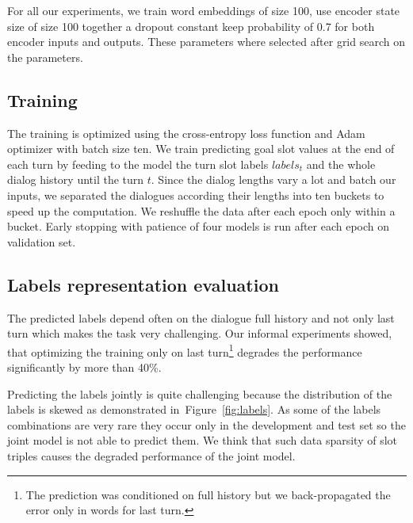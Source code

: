 \documentclass{itatnew}
\def\PB#1{\textcolor{red}{PB: \textit{#1}}}
\def\todo#1{\textcolor{purple}{todo: \textit{#1}}}
\begin{document}
For all our experiments, we train word embeddings of size 100, use encoder state size of size 100 together a dropout constant keep probability of 0.7 for both encoder inputs and outputs.
These parameters where selected after grid search on the parameters.

\subsection{Training}
\label{sec:train}
The training is optimized using the cross-entropy loss function and Adam optimizer\cite{kingma2014adam} with batch size ten.
We train predicting goal slot values at the end of each turn by feeding to the model the turn slot labels $labels_t$ and the whole dialog history until the turn $t$.
Since the dialog lengths vary a lot and batch our inputs, we separated the dialogues according their lengths into ten buckets to speed up the computation. We reshuffle the data after each epoch only within a bucket.
Early stopping with patience\cite{prechelt1998early} of four models is run after each epoch on validation set.

\subsection{Labels representation evaluation}
\label{sec:eval}
The predicted labels depend often on the dialogue full history and not only last turn which makes the task very challenging.
Our informal experiments showed, that optimizing the training only on last turn\footnote{The prediction was conditioned on full history but we back-propagated the error only in words for last turn.} degrades the performance significantly by more than 40\%.

Predicting the labels jointly is quite challenging because the distribution of the labels is skewed as demonstrated in~Figure~\ref{fig:labels}.
As some of the labels combinations are very rare they occur only in the development and test set so the joint model is not able to predict them.
We think that such data sparsity of slot triples causes the degraded performance of the joint model.
\end{document}
